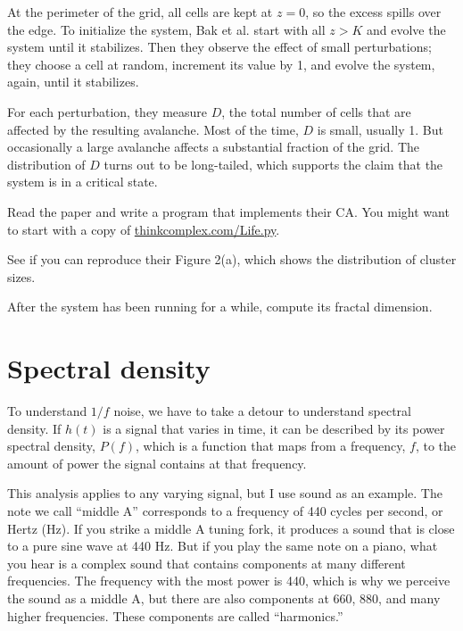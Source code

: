 \documentclass[10pt]{book}
\begin{document}
At the perimeter of the grid, all cells are kept at $z=0$, so
the excess spills over the edge.  To initialize the system,
Bak et al. start with all $z > K$ and evolve the system until
it stabilizes.  Then they observe the effect of small perturbations;
they choose a cell at random, increment its value
by 1, and evolve the system, again, until it stabilizes.

For each perturbation, they measure $D$, the total number
of cells that are affected by the resulting avalanche.  Most of
the time, $D$ is small, usually 1.  But occasionally
a large avalanche affects a substantial fraction
of the grid.  The distribution of $D$ turns out to be long-tailed,
which supports the claim that the system is in a critical state.

\begin{exercise}

Read the paper and write a program that implements their CA.
You might want to start with a copy of
\url{thinkcomplex.com/Life.py}.

See if you can reproduce their Figure 2(a), which shows the
distribution of cluster sizes.

After the system has been running for a while, compute its
fractal dimension.

\end{exercise}


\section{Spectral density}

To understand $1/f$ noise, we have to take a detour to understand
spectral density.  If $h(t)$ is a signal that varies in time, it can
be described by its power spectral density, $P(f)$, which is a
function that maps from a frequency, $f$, to the amount of power the
signal contains at that frequency.

This analysis applies to any varying signal, but I use sound as
an example.  The note we call ``middle A'' corresponds to a frequency
of 440 cycles per second, or Hertz (Hz).  If you strike a middle A
tuning fork, it produces a sound that is close to a pure sine wave at
440 Hz.  But if you play the same note on a piano, what you hear is
a complex sound that contains components at many different
frequencies.  The frequency with the most power is 440, which is why
we perceive the sound as a middle A, but there are also components at
660, 880, and many higher frequencies.  These components are called
``harmonics.''
\end{document}

